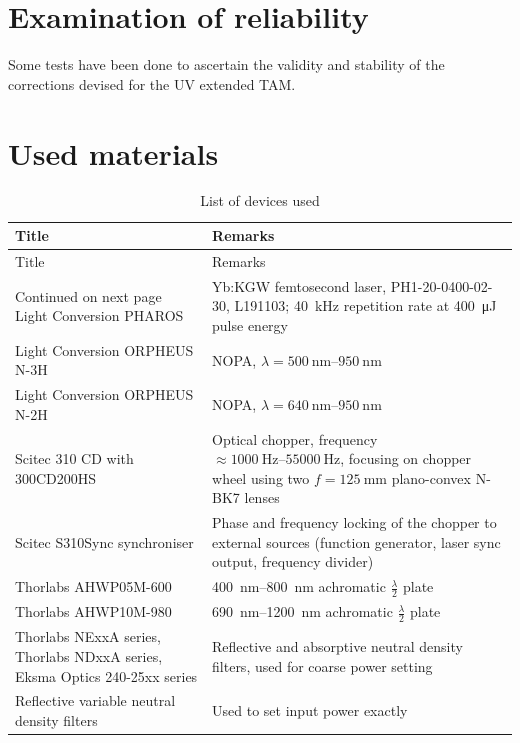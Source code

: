 \documentclass[twoside,openright]{scrreprt}
\begin{document}
\chapter{Examination of reliability}
Some tests have been done to ascertain the validity and stability of the corrections devised for the UV extended TAM.






\chapter*{Used materials}
\begin{longtable}{p{}p{}}
    \caption{List of devices used}
    \label{tab:devices} \\
    \toprule 
    Title & Remarks \\
    \midrule
    \endfirsthead
    \toprule 
    Title & Remarks \\
    \midrule
    \endhead
    \midrule
    Continued on next page
    \endfoot
    \bottomrule
    \endlastfoot
    Light Conversion PHAROS & Yb:KGW femtosecond laser, PH1-20-0400-02-30, L191103; \SI{40}{\kilo\hertz} repetition rate at \SI{400}{\micro\joule} pulse energy \\
    Light Conversion ORPHEUS N-3H & NOPA, $ \lambda = \SIrange{500}{950}{\nano\meter} $ \\
    Light Conversion ORPHEUS N-2H & NOPA, $ \lambda = \SIrange{640}{950}{\nano\meter} $ \\
    Scitec 310 CD with 300CD200HS & Optical chopper, frequency $\approx \SIrange{1000}{55000}{\hertz}$, focusing on chopper wheel using two $f=\SI{125}{\milli\meter}$ plano-convex N-BK7 lenses \\
    Scitec S310Sync synchroniser & Phase and frequency locking of the chopper to external sources (function generator, laser sync output, frequency divider) \\
    Thorlabs AHWP05M-600 & \SIrange{400}{800}{\nano\meter} achromatic $\frac{\lambda}{2}$ plate \\
    Thorlabs AHWP10M-980 & \SIrange{690}{1200}{\nano\meter} achromatic $\frac{\lambda}{2}$ plate \\
    Thorlabs NExxA series, Thorlabs NDxxA series, Eksma Optics 240-25xx series & Reflective and absorptive neutral density filters, used for coarse power setting \\
    Reflective variable neutral density filters & Used to set input power exactly \\

\end{longtable}
\end{document}
